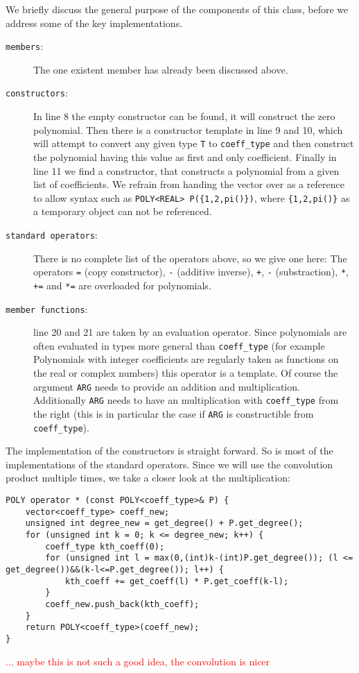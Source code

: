 \documentclass{article}
\newcommand{\code}[1]{\texttt{#1}}
\newcommand{\temp}[1]{\textcolor{red}{#1}}
\begin{document}
We briefly discuss the general purpose of the components of this class, before we address some of the key implementations.
\begin{description}
\item[\code{members}:] The one existent member has already been discussed above.
\item[\code{constructors}:] In line 8 the empty constructor can be found, it will construct the zero polynomial. Then there is a constructor template in line 9 and 10, which will attempt to convert any given type \code{T} to \code{coeff\_type} and then construct the polynomial having this value as first and only coefficient. Finally in line 11 we find a constructor, that constructs a polynomial from a given list of coefficients. We refrain from handing the vector over as a reference to allow syntax such as \code{POLY<REAL> P(\{1,2,pi()\})}, where \code{\{1,2,pi()\}} as a temporary object can not be referenced.
\item[\code{standard operators}:] There is no complete list of the operators above, so we give one here: The operators \code{=} (copy constructor), \code{-} (additive inverse), \code{+}, \code{-} (substraction), \code{*}, \code{+=} and \code{*=} are overloaded for polynomials.
\item[\code{member functions}:] line 20 and 21 are taken by an evaluation operator. Since polynomials are often evaluated in types more general than \code{coeff\_type} (for example Polynomials with integer coefficients are regularly taken as functions on the real or complex numbers) this operator is a template. Of course the argument \code{ARG} needs to provide an addition and multiplication. Additionally \code{ARG} needs to have an multiplication with \code{coeff\_type} from the right (this is in particular the case if \code{ARG} is constructible from \code{coeff\_type}).
\end{description}

The implementation of the constructors is straight forward. So is most of the implementations of the standard operators. Since we will use the convolution product multiple times, we take a closer look at the multiplication:
\begin{lstlisting}
POLY operator * (const POLY<coeff_type>& P) {
	vector<coeff_type> coeff_new;
	unsigned int degree_new = get_degree() + P.get_degree();
	for (unsigned int k = 0; k <= degree_new; k++) {
		coeff_type kth_coeff(0);
		for (unsigned int l = max(0,(int)k-(int)P.get_degree()); (l <= get_degree())&&(k-l<=P.get_degree()); l++) {
			kth_coeff += get_coeff(l) * P.get_coeff(k-l);
		}
		coeff_new.push_back(kth_coeff);
	}			
	return POLY<coeff_type>(coeff_new);
}
\end{lstlisting}
\temp{... maybe this is not such a good idea, the convolution is nicer}
\end{document}
